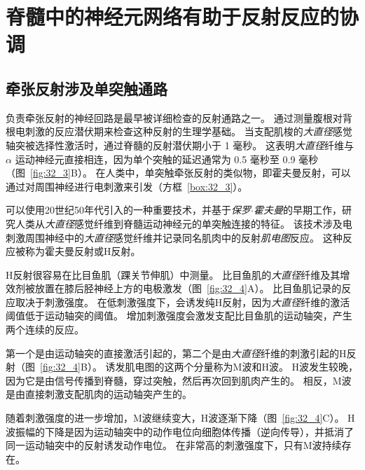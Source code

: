 \section{脊髓中的神经元网络有助于反射反应的协调}

\subsection{牵张反射涉及单突触通路}

负责牵张反射的神经回路是最早被详细检查的反射通路之一。
通过测量腹根对背根电刺激的反应潜伏期来检查这种反射的生理学基础。
当支配肌梭的\textit{大直径}感觉轴突被选择性激活时，通过脊髓的反射潜伏期小于 1 毫秒。
这表明\textit{大直径}纤维与 $ \alpha $ 运动神经元直接相连，因为单个突触的延迟通常为 0.5 毫秒至 0.9 毫秒（图~\ref{fig:32_3}B）。
在人类中，单突触牵张反射的类似物，即霍夫曼反射，可以通过对周围神经进行电刺激来引发（方框~\ref{box:32_3}）。


\begin{proposition}[霍夫曼反射] \label{box:32_3}
	
	\quad \quad 可以使用20世纪50年代引入的一种重要技术，并基于\textit{保罗$\cdot$霍夫曼}的早期工作，研究人类从\textit{大直径}感觉纤维到脊髓运动神经元的单突触连接的特征。
	该技术涉及电刺激周围神经中的\textit{大直径}感觉纤维并记录同名肌肉中的反射\textit{肌电图}反应。
	这种反应被称为霍夫曼反射或H反射。
	
	\quad \quad H反射很容易在比目鱼肌（踝关节伸肌）中测量。
	比目鱼肌的\textit{大直径}纤维及其增效剂被放置在膝后胫神经上方的电极激发（图~\ref{fig:32_4}A）。
	比目鱼肌记录的反应取决于刺激强度。
	在低刺激强度下，会诱发纯H反射，因为\textit{大直径}纤维的激活阈值低于运动轴突的阈值。
	增加刺激强度会激发支配比目鱼肌的运动轴突，产生两个连续的反应。
	
	\quad \quad 第一个是由运动轴突的直接激活引起的，第二个是由\textit{大直径}纤维的刺激引起的H反射（图~\ref{fig:32_4}B）。
	诱发肌电图的这两个分量称为M波和H波。
	H波发生较晚，因为它是由信号传播到脊髓，穿过突触，然后再次回到肌肉产生的。
	相反，M波是由直接刺激支配肌肉的运动轴突产生的。
	
	\quad \quad 随着刺激强度的进一步增加，M波继续变大，H波逐渐下降（图~\ref{fig:32_4}C）。
	H波振幅的下降是因为运动轴突中的动作电位向细胞体传播（逆向传导），并抵消了同一运动轴突中的反射诱发动作电位。
	在非常高的刺激强度下，只有M波持续存在。
	
\end{proposition}


